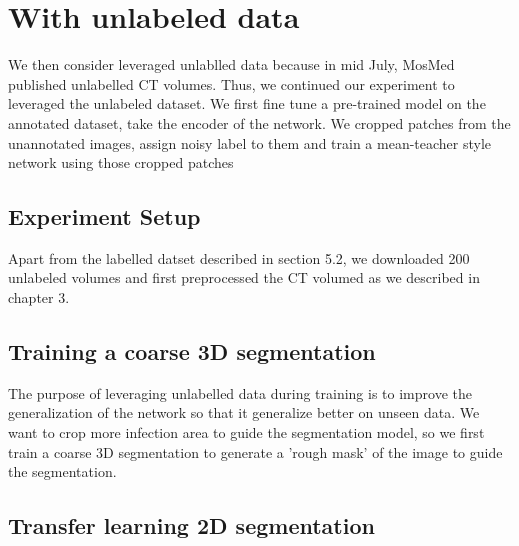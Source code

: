 {\color{red}{We then trained the model using only 5 volumed sliced into 2D......}}

\section{With unlabeled data}
We then consider leveraged unlablled data because in mid July, MosMed published unlabelled CT volumes. Thus, we continued our experiment to leveraged the unlabeled dataset. 
 We first fine tune a pre-trained model on the annotated dataset, take the encoder of the network. We cropped patches from the unannotated images, assign noisy label to them and train a mean-teacher style network using those cropped patches

\subsection{Experiment Setup}
Apart from the labelled datset described in section 5.2, we downloaded 200 unlabeled volumes and first preprocessed the CT volumed as we described in chapter 3.

\subsection{Training a coarse 3D segmentation}
The purpose of leveraging unlabelled data during training is to improve the generalization of the network so that it generalize better on unseen data. We want to crop more infection area to guide the segmentation model, so we first train a coarse 3D segmentation to generate a 'rough mask' of the image to guide the segmentation.
\subsection{Transfer learning 2D segmentation}

